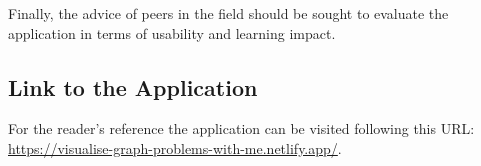 Finally, the advice of peers in the field should be sought to evaluate the
application in terms of usability and learning impact.

\subsection{Link to the Application}
For the reader's reference the application can be visited following this
URL: \\
\href{https://visualise-graph-problems-with-me.netlify.app/} {https://visualise-graph-problems-with-me.netlify.app/}.






% 


%
